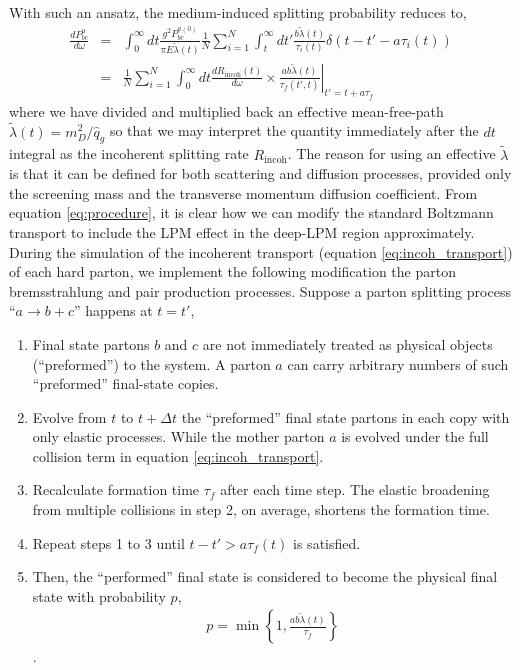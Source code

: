 \documentclass[aps, prc, reprint, amsmath, groupedaddress, nofootinbib]{revtex4-1}
\begin{document}
With such an ansatz, the medium-induced splitting probability reduces to,
\begin{eqnarray}
\nonumber
\frac{dP^{a}_{bc}}{d\omega} &=& \int_0^\infty dt \frac{g^2 P_{bc}^{a(0)}}{\pi E\tilde{\lambda}(t)} \frac{1}{N}\sum_{i=1}^N \int_t^\infty dt' \frac{b \tilde{\lambda}(t)}{\tau_i(t)} \delta(t-t'- a \tau_i(t)) \\
&=& \frac{1}{N}\sum_{i=1}^N\int_0^\infty dt \frac{dR_{\textrm{incoh}}(t)}{d\omega} \times \left.\frac{ab\tilde{\lambda}(t)}{\tau_f(t',t)}\right|_{t'=t+a\tau_f}
\label{eq:procedure}
\end{eqnarray}
where we have divided and multiplied back an effective mean-free-path $\tilde{\lambda}(t) = m_D^2/\hat{q}_g$ so that we may interpret the quantity immediately after the $dt$ integral as the incoherent splitting rate $R_{\textrm{incoh}}$.
The reason for using an effective $\tilde{\lambda}$ is that it can be defined for both scattering and diffusion processes, provided only the screening mass and the transverse momentum diffusion coefficient.
From equation \ref{eq:procedure}, it is clear how we can modify the standard Boltzmann transport to include the LPM effect in the deep-LPM region approximately.
During the simulation of the incoherent transport  (equation \ref{eq:incoh_transport}) of each hard parton, we implement the following modification the parton bremsstrahlung and pair production processes.
Suppose a parton splitting process ``$a\rightarrow b+c$'' happens at $t=t'$,
\begin{enumerate}
\item Final state partons $b$ and $c$ are not immediately treated as physical objects (``preformed'') to the system. A parton $a$ can carry arbitrary numbers of such ``preformed'' final-state copies.
\item Evolve from $t$ to $t+\Delta t$ the ``preformed'' final state partons in each copy with only elastic processes. 
While the mother parton $a$ is evolved under the full collision term in equation \ref{eq:incoh_transport}.
\item Recalculate formation time $\tau_f$ after each time step. 
The elastic broadening from multiple collisions in step 2, on average, shortens the formation time.
\item Repeat steps 1 to 3 until $t-t' > a\tau_f(t)$ is satisfied. 
\item Then, the ``performed'' final state is considered to become the physical final state with probability $p$, 
\begin{eqnarray}
p = \min\left\{1, \frac{ab\tilde{\lambda}(t)}{\tau_f}\right\}
\label{eq:rejection}
\end{eqnarray}.
\end{enumerate}
\end{document}
